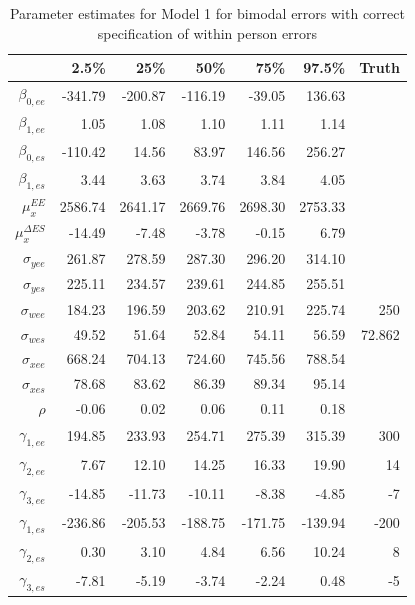 \documentclass[11pt]{article}\usepackage[]{graphicx}\usepackage[]{color}
\begin{document}
\begin{table}[ht]
\centering
\begin{tabular}{rrrrrr|r}
  \hline
 & 2.5\% & 25\% & 50\% & 75\% & 97.5\% & Truth\\
  \hline
$\beta_{0,ee}$ & -341.79 & -200.87 & -116.19 & -39.05 & 136.63 \\ 
  $\beta_{1,ee}$ & 1.05 & 1.08 & 1.10 & 1.11 & 1.14 \\ 
  $\beta_{0,es}$ & -110.42 & 14.56 & 83.97 & 146.56 & 256.27 \\ 
  $\beta_{1,es}$ & 3.44 & 3.63 & 3.74 & 3.84 & 4.05 \\ 
  $\mu_x^{EE}$ & 2586.74 & 2641.17 & 2669.76 & 2698.30 & 2753.33 \\ 
  $\mu_x^{\Delta ES}$ & -14.49 & -7.48 & -3.78 & -0.15 & 6.79 \\ 
  $\sigma_{yee}$ & 261.87 & 278.59 & 287.30 & 296.20 & 314.10 \\ 
  $\sigma_{yes}$ & 225.11 & 234.57 & 239.61 & 244.85 & 255.51 \\ 
  $\sigma_{wee}$ & 184.23 & 196.59 & 203.62 & 210.91 & 225.74 & 250 \\ 
  $\sigma_{wes}$ & 49.52 & 51.64 & 52.84 & 54.11 & 56.59 & 72.862\\ 
  $\sigma_{xee}$ & 668.24 & 704.13 & 724.60 & 745.56 & 788.54 \\ 
  $\sigma_{xes}$ & 78.68 & 83.62 & 86.39 & 89.34 & 95.14 \\ 
  $\rho$ & -0.06 & 0.02 & 0.06 & 0.11 & 0.18 \\ 
  $\gamma_{1,ee}$ & 194.85 & 233.93 & 254.71 & 275.39 & 315.39 & 300\\ 
  $\gamma_{2,ee}$ & 7.67 & 12.10 & 14.25 & 16.33 & 19.90 & 14\\ 
  $\gamma_{3,ee}$ & -14.85 & -11.73 & -10.11 & -8.38 & -4.85 & -7\\ 
  $\gamma_{1,es}$ & -236.86 & -205.53 & -188.75 & -171.75 & -139.94 & -200 \\ 
  $\gamma_{2,es}$ & 0.30 & 3.10 & 4.84 & 6.56 & 10.24 & 8\\ 
  $\gamma_{3,es}$ & -7.81 & -5.19 & -3.74 & -2.24 & 0.48 & -5\\ 
  \hline
\end{tabular}
\caption{Parameter estimates for Model 1 for bimodal errors with correct specification of within person errors}
\label{m1bwpestimates}
\end{table}
\end{document}
